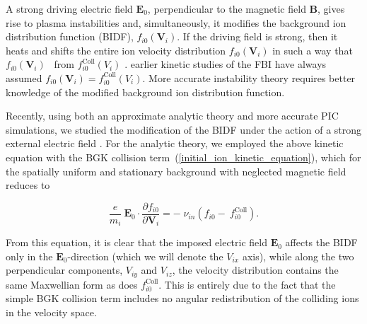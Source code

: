 \documentclass[draft]{agujournal2019}
\renewcommand{\vec}{\mathbf}
\begin{document}
A strong driving electric field $\vec{E}_{0}$, perpendicular to the magnetic
field $\vec{B}$, gives rise to plasma instabilities and, simultaneously,
it modifies the background ion distribution function (BIDF), $f_{i0}(\vec{V}_{i})$. If
the driving field is strong, then it heats and shifts the entire ion
velocity distribution $f_{i0}(\vec{V}_{i})$ in such a way that $f_{i0}(\vec
{V}_{i})$\   from $f_{i0}^{\mathrm{Coll}}\left(V_{i}\right)$
\cite{Schunk:Ion72,Gurevich:Nonlinear78,St-Maurice:Auroral77,St-Maurice:Ion79,Koontaweepunya:Non-Maxwellian24}.  earlier
kinetic studies of the FBI have always assumed $f_{i0}(\vec{V}_{i})=f_{i0}^{\mathrm{Coll}}\left(  V_{i}\right)$. 
More accurate instability theory requires better
knowledge of the modified background ion distribution function.

Recently, using both an approximate analytic theory and more accurate PIC
simulations, we studied the modification of the BIDF under the action of a strong external electric field
\cite{Koontaweepunya:Non-Maxwellian24}. For the analytic theory, we employed
the above kinetic equation with the BGK collision
term~(\ref{initial_ion_kinetic_equation}), which for the spatially uniform and
stationary background with neglected magnetic field reduces to
\begin{linenomath*}
\begin{equation}
\frac{e}{m_{i}}\ \vec{E}_{0}\cdot\frac{\partial f_{i0}}{\partial\vec{V}_{i}%
}=-\;\nu_{in}\left(  f_{i0}-\ f_{i0}^{\mathrm{Coll}}\right).
\label{zero-order_kinetic_equation}
\end{equation}
\end{linenomath*}
From this equation, it is clear that the imposed electric field $\vec{E}_{0}$
affects the BIDF only in the $\vec{E}_{0}$-direction
(which we will denote the $V_{ix}$ axis), while along the two perpendicular
components, $V_{iy}$ and $V_{iz}$, the velocity distribution contains the same
Maxwellian form as does $f_{i0}^{\mathrm{Coll}}$. This is entirely due to the
fact that the simple BGK collision term includes no angular redistribution of
the colliding ions in the velocity space. 
\end{document}
